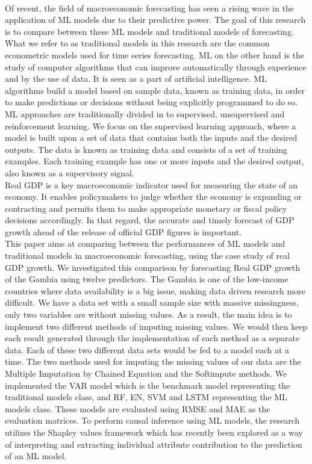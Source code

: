 \documentclass[12pt,italian, twoside]{report}
\begin{document}
\\
Of recent, the field of macroeconomic forecasting has seen a rising wave in the application of ML models due to their predictive power. The goal of this research is to compare between these ML models and traditional models of forecasting. What we refer to as traditional models in this research are the common econometric models used for time series forecasting. ML on the other hand is the study of computer algorithms that can improve automatically through experience and by the use of data. It is seen as a part of artificial intelligence. ML algorithms build a model based on sample data, known as training data, in order to make predictions or decisions without being explicitly programmed to do so. ML approaches are traditionally divided in to supervised, unsupervised and reinforcement learning. We focus on the supervised learning approach, where a model is built upon a set of data that contains both the inputs and the desired outputs. The data is known as training data and consists of a set of training examples. Each training example has one or more inputs and the desired output, also known as a supervisory signal.
\\
Real GDP is a key macroeconomic indicator used for measuring the state of an economy. It enables policymakers to judge whether the economy is expanding or contracting and permits them to make appropriate monetary or fiscal policy decisions accordingly. In that regard, the accurate and timely forecast of GDP growth ahead of the release of official GDP figures is important.\\ 
This paper aims at comparing between the performances of ML models and traditional models in macroeconomic forecasting, using the case study of real GDP growth. We investigated this comparison by forecasting Real GDP growth of the Gambia using twelve predictors. The Gambia is one of the low-income countries where data availability is a big issue, making data driven research more difficult. We have a data set with a small sample size with massive missingness, only two variables are without missing values. As a result, the main idea is to implement two different methods of imputing missing values. We would then keep each result generated through the implementation of each method as a separate data. Each of these two different data sets would be fed to a model each at a time. The two methods used for imputing the missing values of our data are the Multiple Imputation by Chained Equation and the Softimpute methods. We implemented the VAR model which is the benchmark model representing the traditional models class, and RF, EN, SVM and LSTM representing the ML models class. These models are evaluated using RMSE and MAE as the evaluation matrices. To perform causal inference using ML models, the research utilizes the Shapley values framework which has recently been explored as a way of interpreting and extracting individual attribute contribution to the prediction of an ML model.
\end{document}
